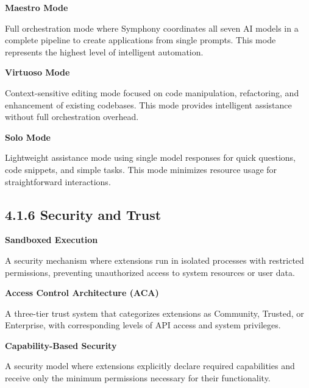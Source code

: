\vspace{0.3cm}

\noindent\textbf{Maestro Mode}

Full orchestration mode where Symphony coordinates all seven AI models in a complete pipeline to create applications from single prompts. This mode represents the highest level of intelligent automation.

\vspace{0.3cm}

\noindent\textbf{Virtuoso Mode}

Context-sensitive editing mode focused on code manipulation, refactoring, and enhancement of existing codebases. This mode provides intelligent assistance without full orchestration overhead.

\vspace{0.3cm}

\noindent\textbf{Solo Mode}

Lightweight assistance mode using single model responses for quick questions, code snippets, and simple tasks. This mode minimizes resource usage for straightforward interactions.

\subsection*{4.1.6 Security and Trust}

\vspace{0.3cm}

\noindent\textbf{Sandboxed Execution}

A security mechanism where extensions run in isolated processes with restricted permissions, preventing unauthorized access to system resources or user data.

\vspace{0.3cm}

\noindent\textbf{Access Control Architecture (ACA)}

A three-tier trust system that categorizes extensions as Community, Trusted, or Enterprise, with corresponding levels of API access and system privileges.

\vspace{0.3cm}

\noindent\textbf{Capability-Based Security}

A security model where extensions explicitly declare required capabilities and receive only the minimum permissions necessary for their functionality.

